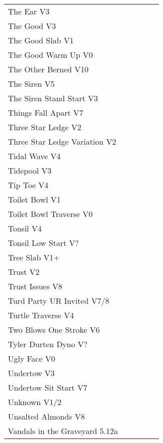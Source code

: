 \begin{flushleft}
\begin{center}
\begin{supertabular}{p{0.76\linewidth}p{0.08\linewidth}}
The Ear V3 & \pageref{rt:The Ear} \\
The Good V3 & \pageref{rt:The Good} \\
The Good Slab V1 & \pageref{rt:The Good Slab} \\
The Good Warm Up V0 & \pageref{rt:The Good Warm Up} \\
The Other Berned V10 & \pageref{rt:The Other Berned} \\
The Siren V5 & \pageref{rt:The Siren} \\
The Siren Stand Start V3 & \pageref{vr:The Siren Stand Start} \\
Things Fall Apart V7 & \pageref{rt:PA 2} \\
Three Star Ledge V2 & \pageref{rt:Three Star Ledge} \\
Three Star Ledge Variation V2 & \pageref{vr:Three Star Ledge Variation} \\
Tidal Wave V4 & \pageref{rt:DSD 3} \\
Tidepool V3 & \pageref{rt:Tidepool} \\
Tip Toe V4 & \pageref{rt:Tip Toe} \\
Toilet Bowl V1 & \pageref{rt:Toilet Bowl} \\
Toilet Bowl Traverse V0 & \pageref{rt:Toilet Bowl Traverse} \\
Tonsil V4 & \pageref{rt:Tonsil} \\
Tonsil Low Start V? & \pageref{vr:Tonsil Low Start} \\
Tree Slab V1+ & \pageref{rt:Tree Slab} \\
Trust V2 & \pageref{rt:Trust} \\
Trust Issues V8 & \pageref{rt:Trust Issues} \\
Turd Party UR Invited V7/8 & \pageref{rt:Turd Party UR Invited} \\
Turtle Traverse V4 & \pageref{vr:Turtle Traverse} \\
Two Blows One Stroke V6 & \pageref{rt:Two Blows One Stroke} \\
Tyler Durten Dyno V? & \pageref{vr:Tyler Durten Dyno} \\
Ugly Face V0 & \pageref{rt:Ugly Face} \\
Undertow V3 & \pageref{rt:Undertow} \\
Undertow Sit Start V7 & \pageref{vr:Undertow Sit Start} \\
Unknown V1/2 & \pageref{rt:Unknown on E's Dirty B} \\
Unsalted Almonds V8 & \pageref{rt:Unsalted Almonds} \\
Vandals in the Graveyard 5.12a & \pageref{rt:Vandals in the Graveyard} \\

\end{supertabular}
\end{center}
\end{flushleft}
